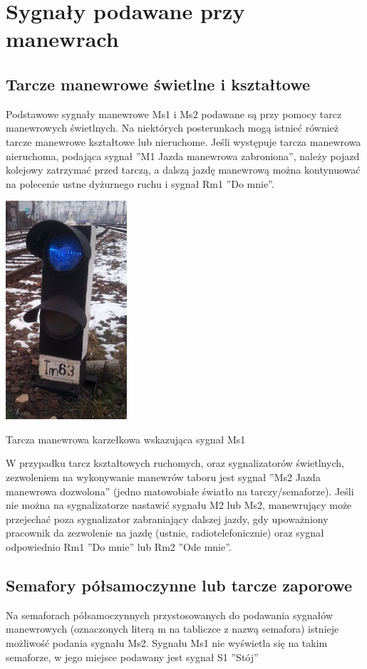 \chapter{Sygnały podawane przy manewrach}

\section{Tarcze manewrowe świetlne i kształtowe}
Podstawowe sygnały manewrowe Ms1 i Ms2 podawane są przy pomocy tarcz manewrowych świetlnych. Na niektórych posterunkach mogą istnieć również tarcze manewrowe kształtowe lub nieruchome. Jeśli występuje tarcza manewrowa nieruchoma, podająca sygnał ''M1 Jazda manewrowa zabroniona'', należy pojazd kolejowy zatrzymać przed tarczą, a dalszą jazdę manewrową można kontynuować na polecenie ustne dyżurnego ruchu i sygnał Rm1 ''Do mnie''.
\begin{marginfigure}
	\includegraphics[width=4.5cm]{skryptkierownik-img/tarcza-manewrowa-ms1.jpg}
	\caption{Tarcza manewrowa karzełkowa wskazująca sygnał Ms1}
\end{marginfigure}
 W przypadku tarcz kształtowych ruchomych, oraz sygnalizatorów świetlnych, zezwoleniem na wykonywanie manewrów taboru jest sygnał ''Ms2 Jazda manewrowa dozwolona'' (jedno matowobiałe światło na tarczy/semaforze). Jeśli nie można na sygnalizatorze nastawić sygnału M2 lub Ms2, manewrujący może przejechać poza sygnalizator zabraniający dalszej jazdy, gdy upoważniony pracownik da zezwolenie na jazdę (ustnie, radiotelefonicznie) oraz sygnał odpowiednio Rm1 ''Do mnie'' lub Rm2 ''Ode mnie''.

\section{Semafory półsamoczynne lub tarcze zaporowe}
Na semaforach półsamoczynnych przystosowanych do podawania sygnałów manewrowych (oznaczonych literą m na tabliczce z nazwą semafora) istnieje możliwość podania sygnału Ms2. Sygnału Ms1 nie wyświetla się na takim semaforze, w jego miejsce podawany jest sygnał S1 ''Stój''

